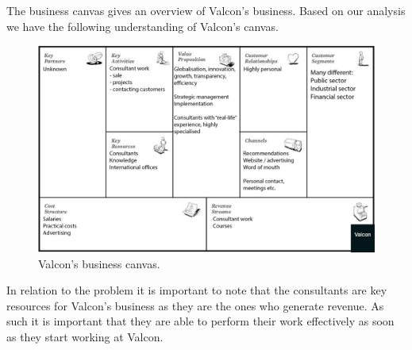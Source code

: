 The business canvas gives an overview of Valcon's business.
Based on our analysis we have the following understanding of Valcon's canvas.
\begin{figure}[!htp]
\includegraphics[width=\textwidth]{inline/business-model-canvas.png}
\caption{Valcon's business canvas.}
\label{fig:canvas}
\end{figure}

In relation to the problem it is important to note that the consultants are key resources for Valcon's business
as they are the ones who generate revenue.
As such it is important that they are able to perform their work effectively as soon as they start working at Valcon.